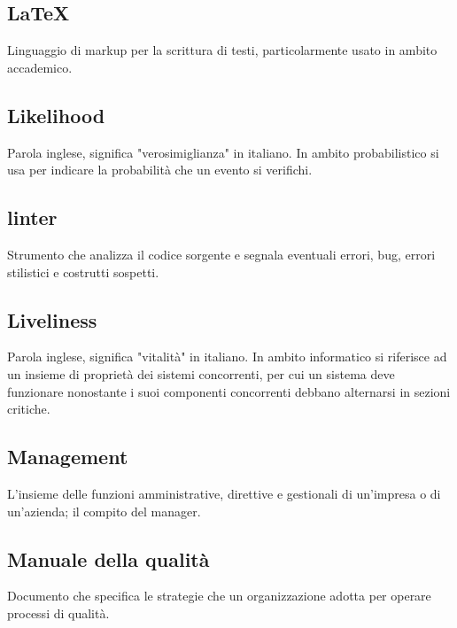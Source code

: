 	\subsection{LaTeX}
	\label{sec:latex}
	Linguaggio di markup per la scrittura di testi, particolarmente usato in ambito accademico.



	\subsection{Likelihood}
	\label{sec:likelihood}
	Parola inglese, significa "verosimiglianza" in italiano. In ambito probabilistico si usa per indicare la probabilità che un evento si verifichi.
	\subsection{linter}
	\label{sec:linter}
	Strumento che analizza il codice sorgente e segnala eventuali errori, bug, errori stilistici e costrutti sospetti.


	\subsection{Liveliness}
	\label{sec:liveliness}
	Parola inglese, significa "vitalità" in italiano. In ambito informatico si riferisce ad un insieme di proprietà dei sistemi concorrenti, per cui un sistema deve funzionare nonostante i suoi componenti concorrenti debbano alternarsi in sezioni critiche.


	\newpage


	\subsection{Management}
	\label{sec:management}
	L'insieme delle funzioni amministrative, direttive e gestionali di un'impresa o di un'azienda; il compito del manager.


	\subsection{Manuale della qualità}
	\label{sec:manualequalita}
	Documento che specifica le strategie che un organizzazione adotta per operare processi di qualità.


